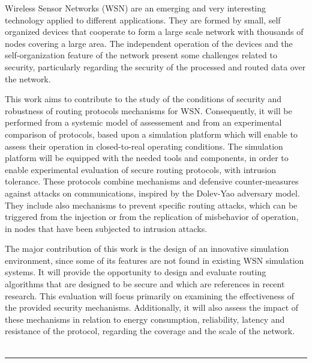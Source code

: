 \abstract
Wireless Sensor Networks (WSN) are an emerging and very interesting technology applied to 
different applications. They are formed by small, self organized devices that cooperate to
form a large scale network with thousands of nodes covering a large area.
The independent operation of the devices and the self-organization feature of the network present
some challenges related to security, particularly regarding the security of the processed and routed
data over the network.  

This work aims to contribute to the study of the conditions of security and
robustness of routing protocols mechanisms for WSN. Consequently, it will be
performed from a systemic model of assessement  and from an experimental comparison of
protocols, based upon a simulation platform which will enable to assess their operation in
closed-to-real operating conditions.  The simulation platform will be equipped with the needed tools
and components, in order to enable experimental evaluation of secure routing protocols, with 
intrusion tolerance. These protocols combine mechanisms and defensive counter-measures against
attacks on communications, inspired by the Dolev-Yao adversary model. They include also mechanisms
to prevent specific routing attacks, which can be triggered from the injection or from the
replication of misbehavior of operation, in nodes that have been subjected to intrusion attacks. 

The major contribution of this work is the design of an innovative simulation environment, since
some of its features are not found in existing WSN simulation systems. It will provide the
opportunity to design and evaluate 
routing algorithms that are designed to be secure and which are references in 
recent research. This evaluation will focus primarily on examining the effectiveness of the provided
security mechanisms. Additionally, it will also assess the
impact of these mechanisms in relation to energy consumption, reliability, latency and resistance of
the protocol, regarding the coverage and the scale of the network.
~\\ ~\\ \rule{\textwidth}{0.2mm}
